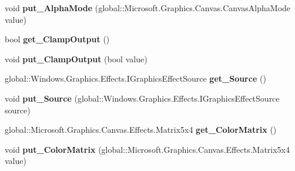 \begin{DoxyCompactItemize}
void {\bfseries put\+\_\+\+Alpha\+Mode} (global\+::\+Microsoft.\+Graphics.\+Canvas.\+Canvas\+Alpha\+Mode value)
\item 
\mbox{\label{interface_microsoft_1_1_graphics_1_1_canvas_1_1_effects_1_1_i_color_matrix_effect_a62eb1bdc351375bda377af3d39f4407d}} 
bool {\bfseries get\+\_\+\+Clamp\+Output} ()
\item 
\mbox{\label{interface_microsoft_1_1_graphics_1_1_canvas_1_1_effects_1_1_i_color_matrix_effect_ac0b84a9c8932bab90011df716de57abc}} 
void {\bfseries put\+\_\+\+Clamp\+Output} (bool value)
\item 
\mbox{\label{interface_microsoft_1_1_graphics_1_1_canvas_1_1_effects_1_1_i_color_matrix_effect_a92c8a46f383c29807747e76c7a9dab74}} 
global\+::\+Windows.\+Graphics.\+Effects.\+I\+Graphics\+Effect\+Source {\bfseries get\+\_\+\+Source} ()
\item 
\mbox{\label{interface_microsoft_1_1_graphics_1_1_canvas_1_1_effects_1_1_i_color_matrix_effect_ad452b45320bc870760daae883acd5030}} 
void {\bfseries put\+\_\+\+Source} (global\+::\+Windows.\+Graphics.\+Effects.\+I\+Graphics\+Effect\+Source source)
\item 
\mbox{\label{interface_microsoft_1_1_graphics_1_1_canvas_1_1_effects_1_1_i_color_matrix_effect_a6d1376fefa6b4c96bab74f3eaa0098a5}} 
global\+::\+Microsoft.\+Graphics.\+Canvas.\+Effects.\+Matrix5x4 {\bfseries get\+\_\+\+Color\+Matrix} ()
\item 
\mbox{\label{interface_microsoft_1_1_graphics_1_1_canvas_1_1_effects_1_1_i_color_matrix_effect_a891c719e926fd98a742b1e49dfd5e99e}} 
void {\bfseries put\+\_\+\+Color\+Matrix} (global\+::\+Microsoft.\+Graphics.\+Canvas.\+Effects.\+Matrix5x4 value)
\item 
\mbox{\label{interface_microsoft_1_1_graphics_1_1_canvas_1_1_effects_1_1_i_color_matrix_effect_a38a2f04f4c349390c6709ea86049bb00}} 

\end{DoxyCompactItemize}

